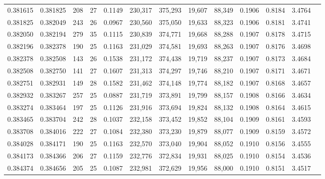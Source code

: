 \begin{tabular}{rrrrrrrrrrrrr}
0.381615 & 0.381825 &   208 &  27 &                                     0.1149 & 230,317 & 375,293 &  19,607 &  88,349 & 0.1906 & 0.8184 & 3.4764 \\
0.381825 & 0.382049 &   243 &  26 &                                     0.0967 & 230,560 & 375,050 &  19,633 &  88,323 & 0.1906 & 0.8181 & 3.4741 \\
0.382050 & 0.382194 &   279 &  35 &                                     0.1115 & 230,839 & 374,771 &  19,668 &  88,288 & 0.1907 & 0.8178 & 3.4715 \\
0.382196 & 0.382378 &   190 &  25 &                                     0.1163 & 231,029 & 374,581 &  19,693 &  88,263 & 0.1907 & 0.8176 & 3.4698 \\
0.382378 & 0.382508 &   143 &  26 &                                     0.1538 & 231,172 & 374,438 &  19,719 &  88,237 & 0.1907 & 0.8173 & 3.4684 \\
0.382508 & 0.382750 &   141 &  27 &                                     0.1607 & 231,313 & 374,297 &  19,746 &  88,210 & 0.1907 & 0.8171 & 3.4671 \\
0.382751 & 0.382931 &   149 &  28 &                                     0.1582 & 231,462 & 374,148 &  19,774 &  88,182 & 0.1907 & 0.8168 & 3.4657 \\
0.382932 & 0.383267 &   257 &  25 &                                     0.0887 & 231,719 & 373,891 &  19,799 &  88,157 & 0.1908 & 0.8166 & 3.4634 \\
0.383274 & 0.383464 &   197 &  25 &                                     0.1126 & 231,916 & 373,694 &  19,824 &  88,132 & 0.1908 & 0.8164 & 3.4615 \\
0.383465 & 0.383704 &   242 &  28 &                                     0.1037 & 232,158 & 373,452 &  19,852 &  88,104 & 0.1909 & 0.8161 & 3.4593 \\
0.383708 & 0.384016 &   222 &  27 &                                     0.1084 & 232,380 & 373,230 &  19,879 &  88,077 & 0.1909 & 0.8159 & 3.4572 \\
0.384028 & 0.384171 &   190 &  25 &                                     0.1163 & 232,570 & 373,040 &  19,904 &  88,052 & 0.1910 & 0.8156 & 3.4555 \\
0.384173 & 0.384366 &   206 &  27 &                                     0.1159 & 232,776 & 372,834 &  19,931 &  88,025 & 0.1910 & 0.8154 & 3.4536 \\
0.384374 & 0.384656 &   205 &  25 &                                     0.1087 & 232,981 & 372,629 &  19,956 &  88,000 & 0.1910 & 0.8151 & 3.4517 \\

\end{tabular}
